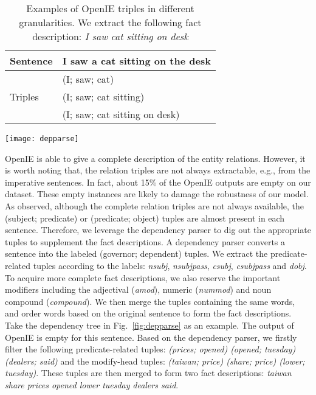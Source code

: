 \documentclass[letterpaper]{article} \usepackage{aaai18}  \usepackage{times}  \usepackage{helvet}  \usepackage{courier}  \usepackage{url}  \usepackage{graphicx}  \usepackage{amsfonts}
\begin{document}
	\begin{table}[t]
		\centering
		\begin{tabular}{l|l}
			\hline
			Sentence                   & I saw a cat sitting on the desk \\ \hline
			\multirow{3}{*}{Triples} & (I; saw; cat)                \\ \cline{2-2} 
			& (I; saw; cat sitting)           \\ \cline{2-2} 
			& (I; saw; cat sitting on desk)   \\ \hline
		\end{tabular}
		\caption{Examples of OpenIE triples in different granularities. We extract the following fact description: \textit{I saw cat sitting on desk}}
		\label{tb:openie_triple}
	\end{table}
	
	\begin{figure*}
		\centering
		\texttt{[image: depparse]}
		\caption{A dependency tree example. The meaning of the dependency labels can be referred to \cite{de2008stanford}. We extract the following two fact descriptions: \textit{taiwan share prices opened lower tuesday}  \textit{dealers said}}
		\label{fig:depparse}
	\end{figure*}
	
	OpenIE is able to give a complete description of the entity relations.
	However, it is worth noting that, the relation triples are not always extractable, e.g., from the imperative sentences.
	In fact, about 15\% of the OpenIE outputs are empty on our dataset.
	These empty instances are likely to damage the robustness of our model.
	As observed, although the complete relation triples are not always available, the (subject; predicate) or (predicate; object) tuples are almost present in each sentence.
	Therefore, we leverage the dependency parser to dig out the appropriate tuples to supplement the fact descriptions.
	A dependency parser converts a sentence into the labeled (governor; dependent) tuples.
	We extract the predicate-related tuples according to the labels: \textit{nsubj}, \textit{nsubjpass}, \textit{csubj}, \textit{csubjpass} and \textit{dobj}.
	To acquire more complete fact descriptions, we also reserve the important modifiers including the adjectival (\textit{amod}), numeric (\textit{nummod}) and noun compound (\textit{compound}).
	We then merge the tuples containing the same words, and order words based on the original sentence to form the fact descriptions.
	Take the dependency tree in Fig.~\ref{fig:depparse} as an example.
	The output of OpenIE is empty for this sentence.
	Based on the dependency parser, we firstly filter the following predicate-related tuples: \textit{(prices; opened) (opened; tuesday) (dealers; said)} and the modify-head tuples: \textit{(taiwan; price) (share; price)  (lower; tuesday)}.
	These tuples are then merged to form two fact descriptions: \textit{taiwan share prices opened lower tuesday}  \textit{dealers said}.  
	
\end{document}
